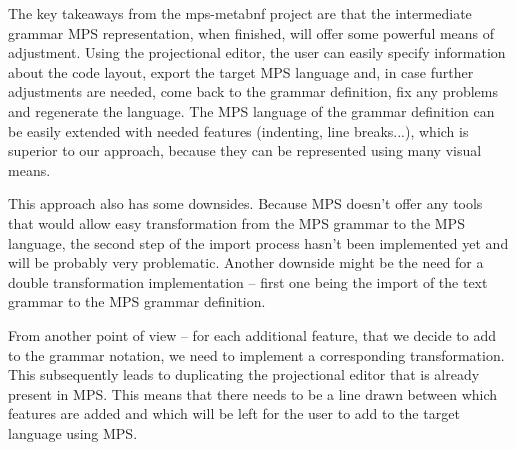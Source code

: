 The key takeaways from the mps-metabnf project are that the intermediate grammar MPS representation, when finished, will offer some powerful means of adjustment.
Using the projectional editor, the user can easily specify information about the code layout, export the target MPS language and, in case further adjustments are needed, come back to the grammar definition, fix any problems and regenerate the language.
The MPS language of the grammar definition can be easily extended with needed features (indenting, line breaks...), which is superior to our approach, because they can be represented using many visual means.

This approach also has some downsides.
Because MPS doesn't offer any tools that would allow easy transformation from the MPS grammar to the MPS language, the second step of the import process hasn't been implemented yet and will be probably very problematic.
Another downside might be the need for a double transformation implementation -- first one being the import of the text grammar to the MPS grammar definition.

From another point of view -- for each additional feature, that we decide to add to the grammar notation, we need to implement a corresponding transformation.
This subsequently leads to duplicating the projectional editor that is already present in MPS.
This means that there needs to be a line drawn between which features are added and which will be left for the user to add to the target language using MPS.


